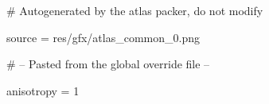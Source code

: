 # Autogenerated by the atlas packer, do not modify

source = res/gfx/atlas_common_0.png

# -- Pasted from the global override file --

anisotropy = 1
